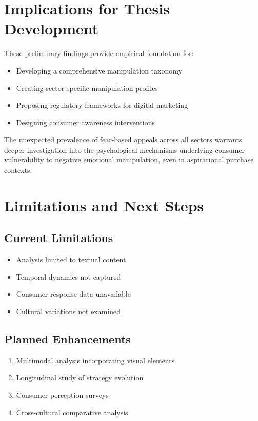 \section{Implications for Thesis Development}

These preliminary findings provide empirical foundation for:

\begin{itemize}
    \item Developing a comprehensive manipulation taxonomy
    \item Creating sector-specific manipulation profiles
    \item Proposing regulatory frameworks for digital marketing
    \item Designing consumer awareness interventions
\end{itemize}

The unexpected prevalence of fear-based appeals across all sectors warrants deeper investigation into the psychological mechanisms underlying consumer vulnerability to negative emotional manipulation, even in aspirational purchase contexts.

\section{Limitations and Next Steps}

\subsection{Current Limitations}

\begin{itemize}
    \item Analysis limited to textual content
    \item Temporal dynamics not captured
    \item Consumer response data unavailable
    \item Cultural variations not examined
\end{itemize}

\subsection{Planned Enhancements}

\begin{enumerate}
    \item Multimodal analysis incorporating visual elements
    \item Longitudinal study of strategy evolution
    \item Consumer perception surveys
    \item Cross-cultural comparative analysis
\end{enumerate}

